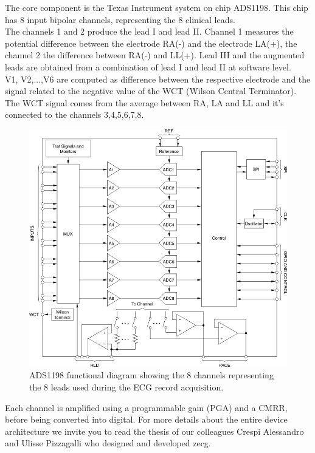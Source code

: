 The core component is the Texas Instrument system on chip ADS1198. This chip has 8 input bipolar channels, representing the 8 clinical leads.\\
The channels 1 and 2 produce the lead I and lead II. Channel 1 measures the potential difference between the electrode RA(-) and the electrode LA(+), the channel 2 the difference between RA(-) and LL(+). Lead III and the augmented leads are obtained from a combination of lead I and lead II at software level.\\
V1, V2,...,V6 are computed as difference between the respective electrode and the signal related to the negative value of the WCT (Wilson Central Terminator).\\
The WCT signal comes from the average between RA, LA and LL and it's connected to the channels 3,4,5,6,7,8.
\begin{figure}[ht!]
	\centering
	\includegraphics[width=120mm]{figures/ch8/2.png}
	\caption{ADS1198 functional diagram showing the 8 channels representing the 8 leads used during the ECG record acquisition.}
	\label{fig8.2}
\end{figure}
Each channel is amplified using a programmable gain (PGA) and a CMRR, before being converted into digital. For more details about the entire device architecture we invite you to read the thesis of our colleagues Crespi Alessandro and Ulisse Pizzagalli\cite{ref22} who designed and developed zecg.
